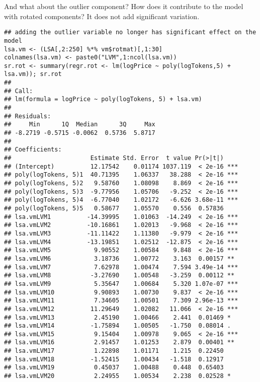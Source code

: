 \documentclass[12pt]{article}\usepackage[]{graphicx}\usepackage[]{color}
\makeatletter
\newenvironment{kframe}{%
 \def\at@end@of@kframe{}%
 \ifinner\ifhmode%
  \def\at@end@of@kframe{\end{minipage}}%
  \begin{minipage}{\columnwidth}%
 \fi\fi%
 \def\FrameCommand##1{\hskip\@totalleftmargin \hskip-\fboxsep
 \colorbox{shadecolor}{##1}\hskip-\fboxsep
     \hskip-\linewidth \hskip-\@totalleftmargin \hskip\columnwidth}%
 \MakeFramed {\advance\hsize-\width
   \@totalleftmargin\z@ \linewidth\hsize
   \@setminipage}}%
 {\par\unskip\endMakeFramed%
 \at@end@of@kframe}
\newenvironment{knitrout}{}{} %
\makeatother
\begin{document}
 And what about the outlier component?  How does it contribute to the
 model with rotated components?  It does not add significant
 variation.

\begin{knitrout}
\color{fgcolor}\begin{kframe}
\begin{verbatim}
## adding the outlier variable no longer has significant effect on the model
lsa.vm <- (LSA[,2:250] %*% vm$rotmat)[,1:30]
colnames(lsa.vm) <- paste0("LVM",1:ncol(lsa.vm))
sr.rot <- summary(regr.rot <- lm(logPrice ~ poly(logTokens,5) + lsa.vm)); sr.rot
## 
## Call:
## lm(formula = logPrice ~ poly(logTokens, 5) + lsa.vm)
## 
## Residuals:
##     Min      1Q  Median      3Q     Max 
## -8.2719 -0.5715 -0.0062  0.5736  5.8717 
## 
## Coefficients:
##                      Estimate Std. Error  t value Pr(>|t|)    
## (Intercept)          12.17542    0.01174 1037.119  < 2e-16 ***
## poly(logTokens, 5)1  40.71395    1.06337   38.288  < 2e-16 ***
## poly(logTokens, 5)2   9.58760    1.08098    8.869  < 2e-16 ***
## poly(logTokens, 5)3  -9.77956    1.05706   -9.252  < 2e-16 ***
## poly(logTokens, 5)4  -6.77040    1.02172   -6.626 3.68e-11 ***
## poly(logTokens, 5)5   0.58677    1.05570    0.556  0.57836    
## lsa.vmLVM1          -14.39995    1.01063  -14.249  < 2e-16 ***
## lsa.vmLVM2          -10.16861    1.02013   -9.968  < 2e-16 ***
## lsa.vmLVM3          -11.11422    1.11380   -9.979  < 2e-16 ***
## lsa.vmLVM4          -13.19851    1.02512  -12.875  < 2e-16 ***
## lsa.vmLVM5            9.90552    1.00584    9.848  < 2e-16 ***
## lsa.vmLVM6            3.18736    1.00772    3.163  0.00157 ** 
## lsa.vmLVM7            7.62978    1.00474    7.594 3.49e-14 ***
## lsa.vmLVM8           -3.27690    1.00548   -3.259  0.00112 ** 
## lsa.vmLVM9            5.35647    1.00684    5.320 1.07e-07 ***
## lsa.vmLVM10           9.90893    1.00730    9.837  < 2e-16 ***
## lsa.vmLVM11           7.34605    1.00501    7.309 2.96e-13 ***
## lsa.vmLVM12          11.29649    1.02082   11.066  < 2e-16 ***
## lsa.vmLVM13           2.45190    1.00466    2.441  0.01469 *  
## lsa.vmLVM14          -1.75894    1.00505   -1.750  0.08014 .  
## lsa.vmLVM15           9.15404    1.00978    9.065  < 2e-16 ***
## lsa.vmLVM16           2.91457    1.01253    2.879  0.00401 ** 
## lsa.vmLVM17           1.22898    1.01171    1.215  0.22450    
## lsa.vmLVM18          -1.52415    1.00434   -1.518  0.12917    
## lsa.vmLVM19           0.45037    1.00488    0.448  0.65403    
## lsa.vmLVM20           2.24955    1.00534    2.238  0.02528 *  

\end{verbatim}
\end{kframe}
\end{knitrout}
\end{document}

